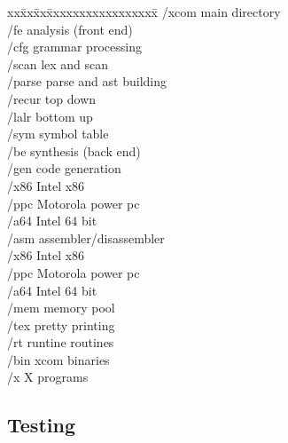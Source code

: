 \begin{tt}
\begin{tabbing}
xx\=xx\=xx\=xxxxxxxxxxxxxxxxx\=\kill
/xcom                     \>\>\>\>\rm main directory         \\
\>/fe                       \>\>\>\rm analysis (front end)   \\
\>\>/cfg                      \>\>\rm grammar processing     \\
\>\>/scan                     \>\>\rm lex and scan           \\
\>\>/parse                    \>\>\rm parse and ast building \\
\>\>\>/recur                    \>\rm top down               \\
\>\>\>/lalr                     \>\rm bottom up              \\
\>\>/sym                      \>\>\rm symbol table           \\
\>/be                       \>\>\>\rm synthesis (back end)   \\
\>\>/gen                      \>\>\rm code generation        \\
\>\>\>/x86                      \>\rm Intel x86              \\
\>\>\>/ppc                      \>\rm Motorola power pc      \\
\>\>\>/a64                      \>\rm Intel 64 bit           \\
\>\>/asm                      \>\>\rm assembler/disassembler \\
\>\>\>/x86                      \>\rm Intel x86              \\
\>\>\>/ppc                      \>\rm Motorola power pc      \\
\>\>\>/a64                      \>\rm Intel 64 bit           \\
\>\>/mem                      \>\>\rm memory pool            \\
\>\>/tex                      \>\>\rm pretty printing        \\
\>/rt                       \>\>\>\rm runtine routines       \\
\>/bin                      \>\>\>\rm xcom binaries          \\
\>/x                        \>\>\>\rm X programs 
\end{tabbing}
\end{tt}

\subsection{Testing}

